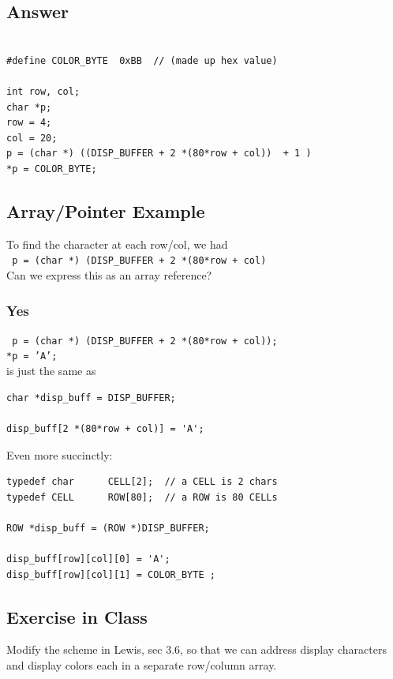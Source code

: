 \documentclass{article}	%
\begin{document}
\subsection*{Answer}
\begin{verbatim}

#define COLOR_BYTE  0xBB  // (made up hex value)

int row, col;
char *p;
row = 4;
col = 20;
p = (char *) ((DISP_BUFFER + 2 *(80*row + col))  + 1 )
*p = COLOR_BYTE;
\end{verbatim}

\subsection{Array/Pointer Example}

To find the character at each row/col, we had \\
{\tt
p = (char *) (DISP\_BUFFER + 2 *(80*row + col)} \\
Can we express this as an array reference?

\subsubsection*{Yes}

{\tt
p = (char *) (DISP\_BUFFER + 2 *(80*row + col)); \\
*p = 'A';} \\
is just the same as
\begin{verbatim}
char *disp_buff = DISP_BUFFER;

disp_buff[2 *(80*row + col)] = 'A';
\end{verbatim}


Even more succinctly:
\begin{verbatim}
typedef char      CELL[2];  // a CELL is 2 chars
typedef CELL      ROW[80];  // a ROW is 80 CELLs

ROW *disp_buff = (ROW *)DISP_BUFFER;

disp_buff[row][col][0] = 'A';
disp_buff[row][col][1] = COLOR_BYTE ;
\end{verbatim}



\subsection{Exercise in Class}


Modify the scheme in Lewis, sec 3.6, so that we
can address display characters and display colors
each in a separate row/column array.
\end{document}
